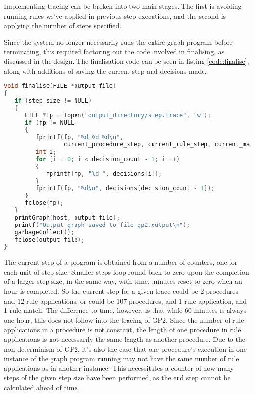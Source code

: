\documentclass{UoYCSproject}
\begin{document}
Implementing tracing can be broken into two main stages. The first is avoiding running rules we've applied in previous step executions, and the second is applying the number of steps specified. 

Since the system no longer necessarily runs the entire graph program before terminating, this required factoring out the code involved in finalising, as discussed in the design. The finalisation code can be seen in listing \ref{code:finalise}, along with additions of saving the current step and decisions made.

\begin{minipage}{\linewidth} %
\begin{lstlisting}[label=code:finalise, caption=Finalise step, language=C]
void finalise(FILE *output_file)
{
   if (step_size != NULL)
   {
      FILE *fp = fopen("output_directory/step.trace", "w");
      if (fp != NULL)
      {
         fprintf(fp, "%d %d %d\n", 
                 current_procedure_step, current_rule_step, current_match_step);
         int i;
         for (i = 0; i < decision_count - 1; i ++)
         {
            fprintf(fp, "%d ", decisions[i]);
         }
         fprintf(fp, "%d\n", decisions[decision_count - 1]);
      }
      fclose(fp);
   }
   printGraph(host, output_file);
   printf("Output graph saved to file gp2.output\n");
   garbageCollect();
   fclose(output_file);
}
\end{lstlisting}
\end{minipage}

The current step of a program is obtained from a number of counters, one for each unit of step size. Smaller steps loop round back to zero upon the completion of a larger step size, in the same way, with time, minutes reset to zero when an hour is completed. So the current step for a given trace could be 2 procedures and 12 rule applications, or could be 107 procedures, and 1 rule application, and 1 rule match. The difference to time, however, is that while 60 minutes is always one hour, this does not follow into the tracing of GP2. Since the number of rule applications in a procedure is not constant, the length of one procedure in rule applications is not necessarily the same length as another procedure. Due to the non-determinism of GP2, it's also the case that one procedure's execution in one instance of the graph program running may not have the same number of rule applications as in another instance. This necessitates a counter of how many steps of the given step size have been performed, as the end step cannot be calculated ahead of time. 
\end{document}
